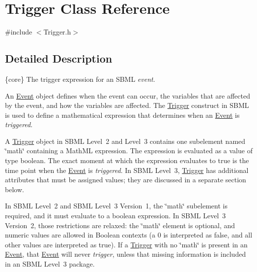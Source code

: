 \hypertarget{class_trigger}{}\section{Trigger Class Reference}
\label{class_trigger}


{\ttfamily \#include $<$Trigger.\+h$>$}



\subsection{Detailed Description}
\{core\} The trigger expression for an S\+B\+ML {\itshape event}.

An \hyperlink{class_event}{Event} object defines when the event can occur, the variables that are affected by the event, and how the variables are affected. The \hyperlink{class_trigger}{Trigger} construct in S\+B\+ML is used to define a mathematical expression that determines when an \hyperlink{class_event}{Event} is {\itshape triggered}.

A \hyperlink{class_trigger}{Trigger} object in S\+B\+ML Level~2 and Level~3 contains one subelement named \char`\"{}math\char`\"{} containing a Math\+ML expression. The expression is evaluated as a value of type {\ttfamily boolean}. The exact moment at which the expression evaluates to {\ttfamily true} is the time point when the \hyperlink{class_event}{Event} is {\itshape triggered}. In S\+B\+ML Level~3, \hyperlink{class_trigger}{Trigger} has additional attributes that must be assigned values; they are discussed in a separate section below.

In S\+B\+ML Level~2 and S\+B\+ML Level~3 Version~1, the \char`\"{}math\char`\"{} subelement is required, and it must evaluate to a {\ttfamily boolean} expression. In S\+B\+ML Level~3 Version~2, those restrictions are relaxed\+: the \char`\"{}math\char`\"{} element is optional, and numeric values are allowed in Boolean contexts (a \textquotesingle{}0\textquotesingle{} is interpreted as {\ttfamily false}, and all other values are interpreted as {\ttfamily true}). If a \hyperlink{class_trigger}{Trigger} with no \char`\"{}math\char`\"{} is present in an \hyperlink{class_event}{Event}, that \hyperlink{class_event}{Event} will never {\itshape trigger}, unless that missing information is included in an S\+B\+ML Level~3 package.

